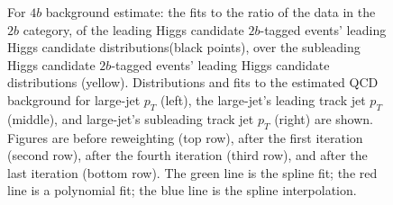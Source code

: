 \begin{figure}[htbp!]
\begin{center}
\caption{For $4b$ background estimate: the fits to the ratio of the data in the $2b$ category, of the leading Higgs candidate $2b$-tagged events' leading Higgs candidate distributions(black points), over the subleading Higgs candidate $2b$-tagged events' leading Higgs candidate distributions (yellow). Distributions and fits to the estimated QCD background for large-\R jet $p_{T}$ (left),  the large-\R jet's leading track jet $p_T$ (middle), and large-\R jet's subleading track jet $p_T$ (right) are shown.  Figures are before reweighting (top row), after the first iteration (second row), after the fourth iteration (third row), and after the last iteration (bottom row). The green line is the spline fit; the red line is a polynomial fit; the blue line is the spline interpolation.}
\label{fig:rw-4b-subl}
\end{center}
\end{figure}


